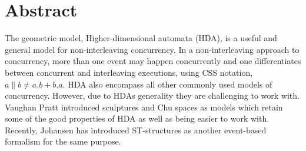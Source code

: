 
\chapter*{Abstract}
\addchaptertocentry{\abstractname} %
    
    
    
    
    
    
    The geometric model, Higher-dimensional automata (HDA), is a useful and general model for non-interleaving concurrency. In a non-interleaving approach to concurrency, more than one event may happen concurrently and one differentiates between concurrent and interleaving executions, using CSS notation, $a \parallel b \neq a.b + b.a$. HDA also encompass all other commonly used models of concurrency. However, due to HDAs generality they are challenging to work with. Vaughan Pratt introduced sculptures and Chu spaces as models which retain some of the good properties of HDA as well as being easier to work with. Recently, Johansen has introduced ST-structures as another event-based formalism for the same purpose.
    
    
